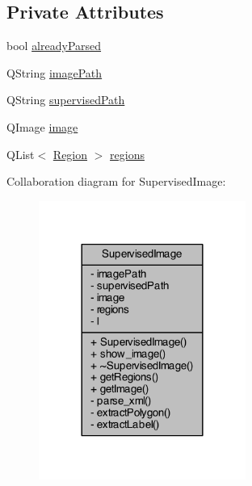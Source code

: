 \subsection*{Private Attributes}
\begin{DoxyCompactItemize}
\item 
bool \hyperlink{class_supervised_image_a9a749e02a7d0f6ba28725465e5f7a29f}{already\+Parsed}
\item 
Q\+String \hyperlink{class_supervised_image_a39f8b0212d2dae489d7b060b0d8dd1b9}{image\+Path}
\item 
Q\+String \hyperlink{class_supervised_image_aeeb634f3804dffba600e6aea71fc353e}{supervised\+Path}
\item 
Q\+Image \hyperlink{class_supervised_image_a0641d3087990ef954a6d5e88e927bbc5}{image}
\item 
Q\+List$<$ \hyperlink{class_region}{Region} $>$ \hyperlink{class_supervised_image_a2113ab863b2253b37dab1d7b575e8b10}{regions}
\end{DoxyCompactItemize}


Collaboration diagram for Supervised\+Image\+:\nopagebreak
\begin{figure}[H]
\begin{center}
\leavevmode
\includegraphics[width=192pt]{class_supervised_image__coll__graph}
\end{center}
\end{figure}


